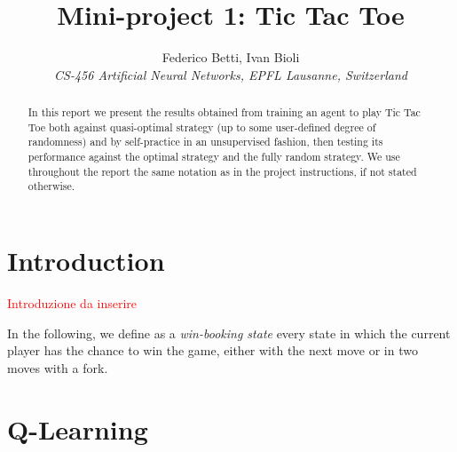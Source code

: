 \documentclass[10pt]{IEEEtran}
\begin{document}
\title{Mini-project 1: Tic Tac Toe}

\author{
   Federico Betti, Ivan Bioli\\
  \textit{CS-456 Artificial Neural Networks, EPFL Lausanne, Switzerland}
}


\maketitle

\begin{abstract}
In this report we present the results obtained from training an agent to play Tic Tac Toe both against quasi-optimal strategy (up to some user-defined degree of randomness) and by self-practice in an unsupervised fashion, then testing its performance against the optimal strategy and the fully random strategy. We use throughout the report the same notation as in the project instructions, if not stated otherwise. 
\end{abstract}

\section{Introduction}
\textcolor{red}{Introduzione da inserire}

In the following, we define as a \emph{win-booking state} every state in which the current player has the chance to win the game, either with the next move or in two moves with a fork.

\section{Q-Learning}
\end{document}
